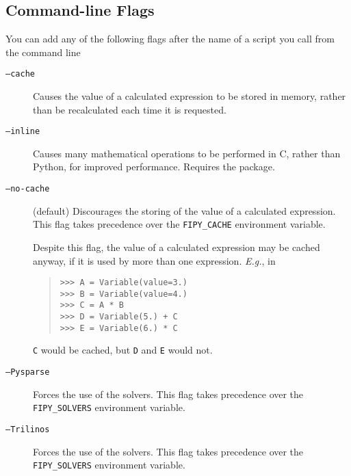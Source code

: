         \subsection{Command-line Flags}
        You can add any of the following flags after the name of a 
        script you call from the command line
        \begin{description}
            \item[\texttt{--cache}] Causes the value of a calculated 
             expression to be stored in memory, 
            rather than be recalculated each time it is requested.
            
            \item[\texttt{--inline}] Causes many mathematical
            operations to be performed in C, rather than Python, for
            improved performance. Requires the \SciPy{} \weave{}
            package. 

            \item[\texttt{--no-cache}] (default) Discourages the
            storing of the value of a calculated 
            expression. This flag takes precedence over the \texttt{FIPY\_CACHE}
            environment variable.
            \begin{reSTadmonition}[Note]
                Despite this flag, the value of a calculated 
                 expression may be cached anyway, if 
                it is used by more than one expression. \emph{E.g.}, 
                in
                \begin{quote}
\begin{verbatim}
>>> A = Variable(value=3.)
>>> B = Variable(value=4.)
>>> C = A * B
>>> D = Variable(5.) + C
>>> E = Variable(6.) * C
\end{verbatim}
                \end{quote}
                \texttt{C} would be cached, but \texttt{D} and 
                \texttt{E} would not.
            \end{reSTadmonition}

            \item[\texttt{--Pysparse}] Forces the use of the 
            \Trilinos{} solvers. This flag takes precedence over the 
            \texttt{FIPY\_SOLVERS} environment variable.

            \item[\texttt{--Trilinos}] Forces the use of the 
            \Trilinos{} solvers. This flag takes precedence over the 
            \texttt{FIPY\_SOLVERS} environment variable.
        \end{description}
        
